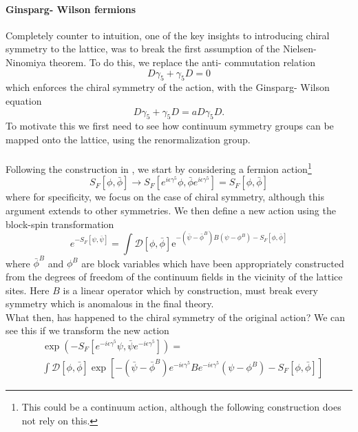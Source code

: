 \documentclass[a4paper,10pt]{book}
\begin{document}
\paragraph{Ginsparg- Wilson fermions}
Completely counter to intuition, one of the key insights to introducing chiral symmetry to the lattice, was to break the first assumption of the Nielsen-Ninomiya theorem. To do this, we replace the anti- commutation relation
\begin{equation}
D \gamma_{5}+\gamma_{5} D=0
\end{equation}
which enforces the chiral symmetry of the action, with the Ginsparg- Wilson equation
\begin{equation}
D \gamma_{5}+\gamma_{5} D=a D \gamma_{5} D.
\end{equation}
To motivate this we first need to see how continuum symmetry groups can be mapped onto the lattice, using the renormalization group.\\\\Following the construction in \cite{GinspargPaulH1982Aroc}, we start by considering a fermion action\footnote{This could be a continuum action, although the following construction does not rely on this.}
\begin{equation}
S_{F}[\phi, \bar{\phi}] \rightarrow S_{F}\left[e^{i \epsilon \gamma^{5}} \phi, \bar{\phi} e^{i \epsilon \gamma^{5}}\right]=S_{F}\left[ \phi, \bar{\phi} \right]
\end{equation}
where for specificity, we focus on the case of chiral symmetry, although this argument extends to other symmetries. We then define a new action using the block-spin transformation
\begin{equation}
e^{-S_F[\psi,\bar{\psi}]}=\int \mathcal{D}[\phi, \bar{\phi}] \mathrm{e}^{-\left(\bar{\psi}-\bar{\phi}^{B}\right) B\left(\psi-\phi^{B}\right)-S_{F}[\phi, \bar{\phi}]}
\end{equation}
where $\bar{\phi}^{B}$ and $\phi^{B}$ are block variables which have been appropriately constructed from the degrees of freedom of the continuum fields in the vicinity of the lattice sites. Here $B$ is a linear operator which by construction, must break every symmetry which is anomalous in the final theory.\\What then, has happened to the chiral symmetry of the original action? We can see this if we transform the new action
\begin{equation}
\begin{aligned} 
&\exp \left(-S_F\left[e^{-i \epsilon \gamma^{5}} \psi, \bar{\psi} e^{-i \epsilon \gamma^{5}}\right]\right)=\\&\int \mathcal{D}[\phi, \bar{\phi}] \exp \left[-(\bar{\psi}-\bar{\phi}^B) e^{-i \epsilon \gamma^{5}} B e^{-i \epsilon \gamma^{5}}(\psi-\phi^B)-S_F[\phi, \bar{\phi}]\right]
\end{aligned}
\end{equation}
\end{document}
